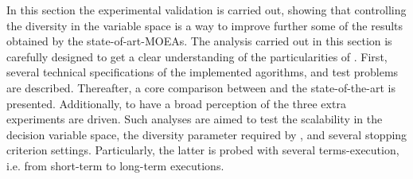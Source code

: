 In this section the experimental validation is carried out, showing that controlling the diversity in the variable space is a way to improve further some of the results obtained by the state-of-art-MOEAs.
%
The analysis carried out in this section is carefully designed to get a clear understanding of the particularities of \VSDMOEA{}.
%
First, several technical specifications of the implemented agorithms, and test problems are described.
%
Thereafter, a core comparison between \VSDMOEA{} and the state-of-the-art is presented.
%
Additionally, to have a broad perception of the \VSDMOEA{} three extra experiments are driven.
%
Such analyses are aimed to test the scalability in the decision variable space, the diversity parameter required by \VSDMOEA{}, and several stopping criterion settings.
%
Particularly, the latter is probed with several terms-execution, i.e. from short-term to long-term executions.


%
%
%
%
%
%
%
%
%

